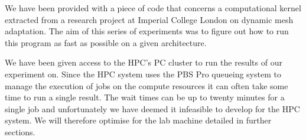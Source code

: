 We have been provided with a piece of code that concerns a computational kernel extracted from a research project at Imperial College London on dynamic mesh adaptation\cite{pragmatic}.
The aim of this series of experiments was to figure out how to run this program as fast as possible on a given architecture.

We have been given access to the HPC's PC cluster to run the results of our experiment on.
Since the HPC system uses the PBS Pro queueing system to manage the execution of jobs on the compute resources it can often take some time to run a single result. The wait times can be up to twenty minutes for a single job and unfortunately we have deemed it infeasible to develop for the HPC system. We will therefore optimise for the lab machine detailed in further sections.